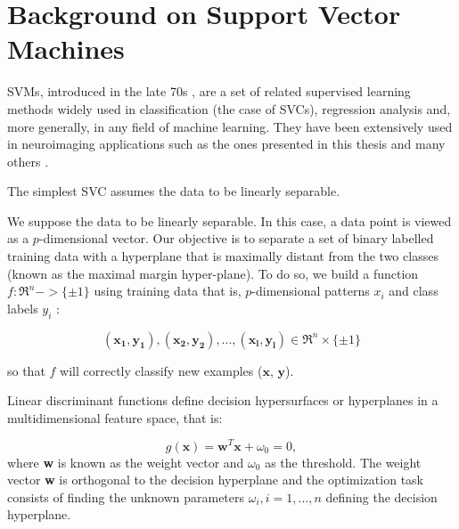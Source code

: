 \chapter{Background on Support Vector Machines}\label{ch:svm}
\acfp{SVM}, introduced in the late 70s \cite{Vapnik1998}, are a set of related supervised learning methods widely used in classification (the case of \acfp{SVC}), regression analysis and, more generally, in any field of machine learning. They have been extensively used in neuroimaging applications such as the ones presented in this thesis \cite{Martinez-Murcia2013255,Martinez-Murcia201458,martinez2014parametrization,Martinez-Murcia2015,Martinez-Murcia2016,Martinez-Murcia2016a} and many others \cite{Stoeckel04,Towey2011,Illan2011,Illan2012,Ortiz2013,Segovia2016a}.

The simplest \ac{SVC} assumes the data to be linearly separable. 

We suppose the data to be linearly separable. In this case, a data point is viewed as a $p$-dimensional vector. Our objective is to separate a set of binary labelled training data with a hyperplane that is maximally distant from the two classes (known as the maximal margin hyper-plane). To do so, we build a function $f : \Re^n -> \lbrace \pm1 \rbrace$ using training data that is, $p$-dimensional patterns $x_i$ and class labels $y_i$ :

\begin{equation}
(\mathbf{x_1} , \mathbf{y_1} ), (\mathbf{x_2} , \mathbf{y_2} ), ..., (\mathbf{x_l} , \mathbf{y_l} ) \in \Re^n \times \lbrace \pm 1\rbrace
\end{equation}

\noindent so that $f$ will correctly classify new examples ($\mathbf{x}$, $\mathbf{y}$).

Linear discriminant functions define decision hypersurfaces or hyperplanes
in a multidimensional feature space, that is:

\begin{equation}
g(\textbf{x}) = \textbf{w}^T \textbf{x} + \omega_0 = 0,
\end{equation}
where \textbf{w} is known as the weight vector and $\omega_0$ as the threshold. The weight vector \textbf{w} is orthogonal to the decision hyperplane and the optimization task consists of finding the unknown parameters $\omega_i , i = 1,...,n$ defining the decision hyperplane.


